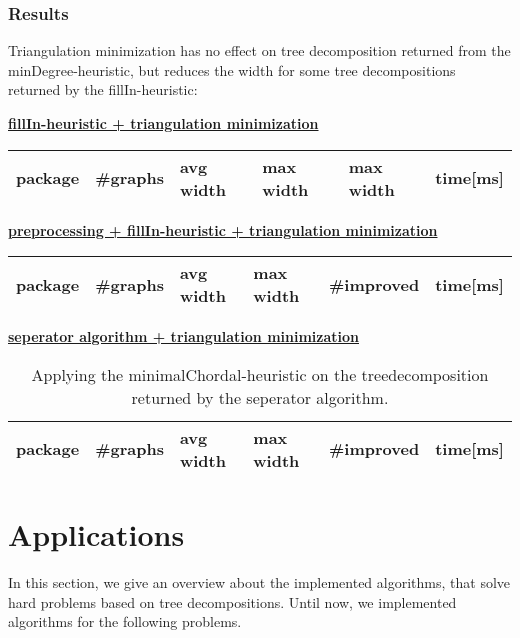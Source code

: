 \documentclass[a4wide]{article}
\begin{document}
\newpage

\subsubsection{Results}

Triangulation minimization has no effect on tree decomposition returned from the minDegree-heuristic, but reduces the width for some tree decompositions returned by the fillIn-heuristic:

\begin{table}[h!]
\underline{\textbf{fillIn-heuristic + triangulation minimization}} \\
\begin{tabular}{|l|l|l|l|l|l|}
\hline
package & \#graphs & avg width & max width & max width & time[ms] \\
\hline
\hline

\hline
\end{tabular}
\end{table}

\begin{table}[h!]
\underline{\textbf{preprocessing + fillIn-heuristic + triangulation minimization}} \\
\begin{tabular}{|l|l|l|l|l|l|}
\hline
package & \#graphs & avg width & max width & \#improved & time[ms] \\
\hline
\hline

\hline
\end{tabular}
\end{table}

\begin{table}[h!]
\underline{\textbf{seperator algorithm + triangulation minimization}} \\
\begin{tabular}{|l|l|l|l|l|l|}
\hline
package & \#graphs & avg width & max width & \#improved & time[ms] \\
\hline
\hline

\hline
\end{tabular}
\caption{Applying the minimalChordal-heuristic on the treedecomposition returned by the seperator algorithm.}
\end{table}

\newpage

\section{Applications}

In this section, we give an overview about the implemented algorithms, that solve hard problems based on tree decompositions. Until now, we implemented algorithms for the following problems.
\end{document}
